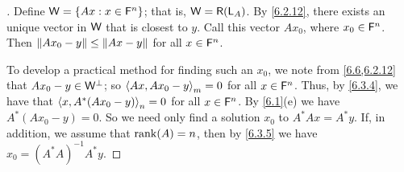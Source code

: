 \begin{proof}[]
  Define \(\mathsf{W} = \left\lbrace Ax : x \in \mathsf{F}^n\right\rbrace\);
  that is, \(\W = \rg{\L_A}\).
  By \cref{6.2.12}, there exists an unique vector in \(\mathsf{W}\) that is closest to \(y\).
  Call this vector \(A x_0\), where \(x_0 \in \mathsf{F}^n\).
  Then \(\left\lVert A x_0 - y\right\rVert \leq \left\lVert Ax - y\right\rVert\) for all \(x \in \mathsf{F}^n\).

  To develop a practical method for finding such an \(x_0\), we note from \cref{6.6,6.2.12} that \(A x_0 - y \in \mathsf{W}^{\perp}\);
  so \(\left\langle Ax, A x_0 - y\right\rangle_m = 0\) for all \(x \in \mathsf{F}^n\).
  Thus, by \cref{6.3.4}, we have that \(\left\langle x, A^* (A x_0 - y)\right\rangle_n = 0\) for all \(x \in \mathsf{F}^n\).
  By \cref{6.1}(e) we have \(A^* (A x_0 - y) = 0\).
  So we need only find a solution \(x_0\) to \(A^* Ax = A^* y\).
  If, in addition, we assume that \(\rk{A} = n\), then by \cref{6.3.5} we have \(x_0 = (A^* A)^{-1} A^* y\).
\end{proof}

